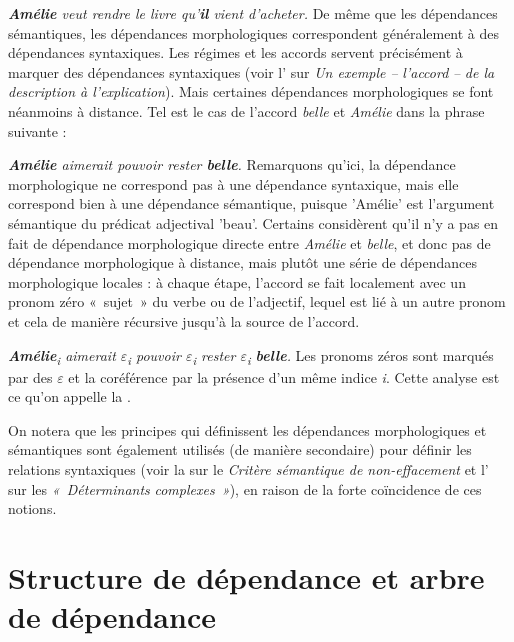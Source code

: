 {    \ea
        \textit{\textbf{{Amélie}}  {veut rendre le livre qu’}\textbf{{il}}  {vient d’acheter.}}
    \z
    De même que les dépendances sémantiques, les dépendances morphologiques correspondent généralement à des dépendances syntaxiques. Les régimes et les accords servent précisément à marquer des dépendances syntaxiques (voir l' sur \textit{Un exemple –} \textit{l’accord} \textit{–} \textit{de la description à l’explication}). Mais certaines dépendances morphologiques se font néanmoins à distance. Tel est le cas de l'accord \textit{belle} et \textit{Amélie} dans la phrase suivante :
    
    \ea
        \textit{\textbf{{Amélie}}  {aimerait pouvoir rester} \textbf{{belle}}.}
    \z
    Remarquons qu'ici, la dépendance morphologique ne correspond pas à une dépendance syntaxique, mais elle correspond bien à une dépendance sémantique, puisque 'Amélie' est l'argument sémantique du prédicat adjectival 'beau'.
     Certains considèrent qu’il n’y a pas en fait de dépendance morphologique directe entre \textit{Amélie} et \textit{belle}, et donc pas de dépendance morphologique à distance, mais plutôt une série de dépendances morphologique locales : à chaque étape, l’accord se fait localement avec un pronom zéro «~sujet~» du verbe ou de l’adjectif, lequel est lié à un autre pronom et cela de manière récursive jusqu’à la source de l’accord.
    
    \ea
       \textit{ \textbf{{Amélie}}{\textsubscript{i}}  {aimerait} \textrm{${\varepsilon}$}{\textsubscript{i}}  {pouvoir} \textrm{${\varepsilon}$}{\textsubscript{i}}  {rester} \textrm{${\varepsilon}$}{\textsubscript{i}} \textbf{{belle}}.}
    \z
    Les pronoms zéros sont marqués par des \textrm{${\varepsilon}$} et la coréférence par la présence d’un même indice \textit{i}. Cette analyse est ce qu'on appelle la .

    On notera que les principes qui définissent les dépendances morphologiques et sémantiques sont également utilisés (de manière secondaire) pour définir les relations syntaxiques (voir la  sur le \textit{Critère sémantique de non-effacement} et l’ sur les \textit{«~Déterminants} \textit{complexes~»}), en raison de la forte coïncidence de ces notions.
}
\section{Structure de dépendance et arbre de dépendance}\label{sec:3.3.4}\largerpage

